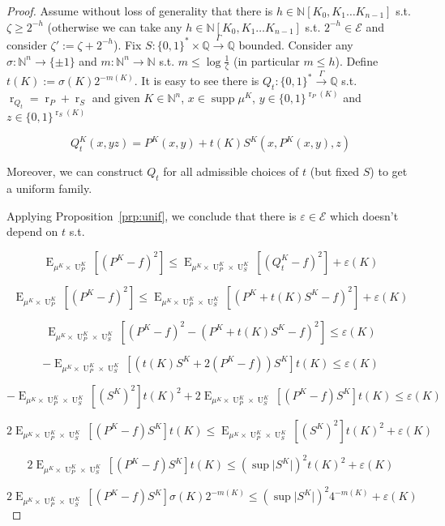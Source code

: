 \documentclass{article}
\numberwithin{equation}{section}
\theoremstyle{definition}
\theoremstyle{plain}
\newcommand{\Bool}{\{0,1\}}
\newcommand{\Words}{{\Bool^*}}
\newcommand{\WordsLen}[1]{{\Bool^{#1}}}
\DeclareMathOperator{\Supp}{supp}
\DeclareMathOperator{\E}{E}
\DeclareMathOperator{\R}{r}
\DeclareMathOperator{\Un}{U}
\newcommand{\Nats}{\mathbb{N}}
\newcommand{\Rats}{\mathbb{Q}}
\newcommand{\NatPoly}{\Nats[K_0, K_1 \ldots K_{n-1}]}
\newcommand{\NatFun}{\Nats^n \rightarrow}
\newcommand{\Abs}[1]{\lvert #1 \rvert}
\newcommand{\Fall}{\mathcal{E}}
\newcommand{\Scheme}{\xrightarrow{\Gamma}}
\begin{document}
\begin{proof}

Assume without loss of generality that there is ${h \in \NatPoly}$ s.t. $\zeta \geq 2^{-h}$ (otherwise we can take any $h \in \NatPoly$ s.t. $2^{-h} \in \Fall$ and consider $\zeta':=\zeta+2^{-h}$). Fix $S: \Words \times \Rats \Scheme \Rats$ bounded. Consider any ${\sigma: \NatFun \{ \pm 1 \}}$ and $m: \NatFun \Nats$ s.t. $m \leq \log \frac{1}{\zeta}$ (in particular ${m \leq h}$). Define ${t(K) := \sigma(K) 2^{-m(K)}}$. It is easy to see there is ${Q_t: \Words \Scheme \Rats}$ s.t. ${\R_{Q_t}=\R_P+\R_S}$ and given $K \in \Nats^n$, $x \in \Supp \mu^{K}$, ${y \in \WordsLen{\R_P(K)}}$ and ${z \in \WordsLen{ \R_S(K)}}$

$$Q_t^{K}(x,yz) = P^{K}(x,y) + t(K) S^{K}(x,P^{K}(x,y),z)$$

Moreover, we can construct $Q_t$ for all admissible choices of $t$ (but fixed $S$) to get a uniform family.

Applying Proposition~\ref{prp:unif}, we conclude that there is $\varepsilon \in \Fall$ which doesn't depend on $t$ s.t.

$$\E_{\mu^{K} \times \Un_P^{K}}[(P^{K} - f)^2] \leq \E_{\mu^{K} \times \Un_P^{K} \times \Un_S^{K}}[(Q_t^{K} - f)^2] + \varepsilon(K)$$

$$\E_{\mu^{K} \times \Un_P^{K}}[(P^{K} - f)^2] \leq \E_{\mu^{K} \times \Un_P^{K} \times \Un_S^{K}}[(P^{K} + t(K)S^{K}  - f)^2] + \varepsilon(K)$$

$$\E_{\mu^{K} \times \Un_P^{K} \times \Un_S^{K}}[(P^{K} - f)^2 - (P^{K} + t(K)S^{K} - f)^2] \leq \varepsilon(K)$$

$$-\E_{\mu^{K} \times \Un_P^{K} \times \Un_S^{K}}[(t(K)S^{K} + 2 (P^{K} - f)) S^{K}] t(K) \leq \varepsilon(K)$$

$$-\E_{\mu^{K} \times \Un_P^{K} \times \Un_S^{K}}[(S^{K})^2] t(K)^2 + 2 \E_{\mu^{K} \times \Un_P^{K} \times \Un_S^{K}}[(P^{K} - f) S^{K}] t(K) \leq \varepsilon(K)$$

$$2 \E_{\mu^{K} \times \Un_P^{K} \times \Un_S^{K}}[(P^{K} - f) S^{K}] t(K) \leq \E_{\mu^{K} \times \Un_P^{K} \times \Un_S^{K}}[(S^{K})^2] t(K)^2 + \varepsilon(K)$$

$$2 \E_{\mu^{K} \times \Un_P^{K} \times \Un_S^{K}}[(P^{K} - f) S^{K}] t(K) \leq (\sup \Abs{S^{K}})^2 t(K)^2 + \varepsilon(K)$$

$$2 \E_{\mu^{K} \times \Un_P^{K} \times \Un_S^{K}}[(P^{K} - f) S^{K}] \sigma(K) 2^{-m(K)} \leq (\sup \Abs{S^{K}})^2 4^{-m(K)} + \varepsilon(K)$$


\end{proof}
\end{document}
